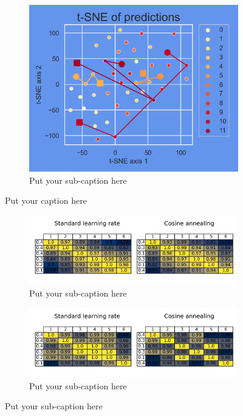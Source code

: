 \begin{figure}[ht]
\begin{subfigure}{.45\textwidth}
		\includegraphics[width=.9\linewidth]{./figs/preds_tSNE_2.png}  
		\caption{Put your sub-caption here}
		\label{fig:sub-second}
	\end{subfigure}
	\caption{Put your caption here}
	\label{fig:fig}
\end{figure}

\blindtext

\begin{figure}[ht]
	\centering
	\begin{subfigure}{1\textwidth}
		\centering
		\includegraphics[width=1\linewidth]{./figs/params_cosine_similarities.png}  
		\caption{Put your sub-caption here}
		\label{fig:sub-first}
	\end{subfigure}
	\begin{subfigure}{1\textwidth}
		\centering
		\includegraphics[width=1\linewidth]{./figs/preds_cosine_similarities.png}  
		\caption{Put your sub-caption here}
		\label{fig:sub-second}
	\end{subfigure}	
\end{figure}




	
\printbibliography[heading=bibintoc,title={References}]
	
